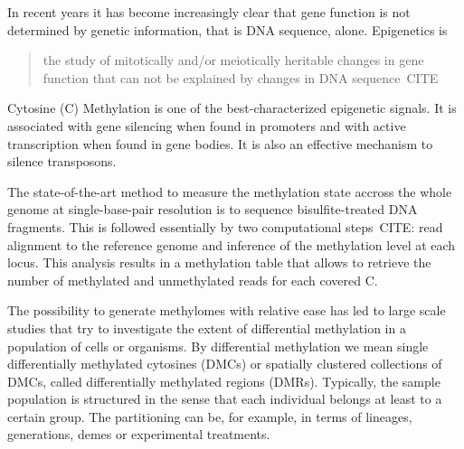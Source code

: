 \documentclass[a4paper]{article}
\begin{document}

In recent years it has become increasingly clear that gene function is
not determined by genetic information, that is DNA sequence,
alone. Epigenetics is
\begin{quote}
  the study of mitotically and/or meiotically heritable changes in
  gene function that can not be explained by changes in DNA
  sequence~CITE
\end{quote}
Cytosine (C) Methylation is one of the best-characterized epigenetic
signals. It is associated with gene silencing when found in promoters
and with active transcription when found in gene bodies. It is also an
effective mechanism to silence transposons.

The state-of-the-art method to measure the methylation state accross
the whole genome at single-base-pair resolution is to sequence
bisulfite-treated DNA fragments. This is followed essentially by two
computational steps~CITE: read alignment to the reference genome and
inference of the methylation level at each locus. This analysis
results in a methylation table that allows to retrieve the number of
methylated and unmethylated reads for each covered C.

The possibility to generate methylomes with relative ease has led to
large scale studies that try to investigate the extent of differential
methylation in a population of cells or organisms. By differential
methylation we mean single differentially methylated cytosines (DMCs)
or spatially clustered collections of DMCs, called differentially
methylated regions (DMRs). Typically, the sample population is
structured in the sense that each individual belongs at least to a
certain group. The partitioning can be, for example, in terms of
lineages, generations, demes or experimental treatments.
\end{document}
